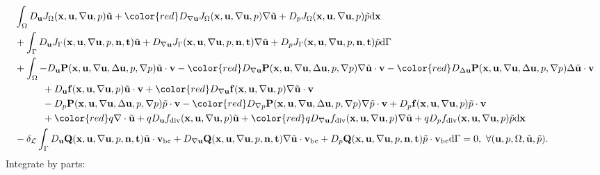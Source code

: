 \documentclass[oneside]{book}
\numberwithin{equation}{section}
\begin{document}
\begin{align*}
    &\int_\Omega D_{\bf u}J_\Omega({\bf x},{\bf u},\nabla{\bf u},p)\tilde{\bf u} + {\color{red}D_{\nabla{\bf u}}J_\Omega({\bf x},{\bf u},\nabla{\bf u},p)\nabla\tilde{\bf u}} + D_pJ_\Omega({\bf x},{\bf u},\nabla{\bf u},p)\tilde{p}{\rm d}{\bf x}\\
    &+ \int_\Gamma D_{\bf u}J_\Gamma({\bf x},{\bf u},\nabla{\bf u},p,{\bf n},{\bf t})\tilde{\bf u} + D_{\nabla{\bf u}}J_\Gamma({\bf x},{\bf u},\nabla{\bf u},p,{\bf n},{\bf t})\nabla\tilde{\bf u} + D_pJ_\Gamma({\bf x},{\bf u},\nabla{\bf u},p,{\bf n},{\bf t})\tilde{p}{\rm d}\Gamma\\
    &+ \int_\Omega -D_{\bf u}{\bf P}({\bf x},{\bf u},\nabla{\bf u},\Delta{\bf u},p,\nabla p)\tilde{\bf u}\cdot{\bf v} - {\color{red}D_{\nabla{\bf u}}{\bf P}({\bf x},{\bf u},\nabla{\bf u},\Delta{\bf u},p,\nabla p)\nabla\tilde{\bf u}\cdot{\bf v}} -  {\color{red}D_{\Delta{\bf u}}{\bf P}({\bf x},{\bf u},\nabla{\bf u},\Delta{\bf u},p,\nabla p)\Delta\tilde{\bf u}\cdot{\bf v}}\\
    &\hspace{1cm} + D_{\bf u}{\bf f}({\bf x},{\bf u},\nabla{\bf u},p)\tilde{\bf u}\cdot{\bf v} +  {\color{red}D_{\nabla{\bf u}}{\bf f}({\bf x},{\bf u},\nabla{\bf u},p)\nabla\tilde{\bf u}\cdot{\bf v}}\\
    &\hspace{1cm} - D_p{\bf P}({\bf x},{\bf u},\nabla{\bf u},\Delta{\bf u},p,\nabla p)\tilde{p}\cdot{\bf v} -  {\color{red}D_{\nabla p}{\bf P}({\bf x},{\bf u},\nabla{\bf u},\Delta{\bf u},p,\nabla p)\nabla\tilde{p}\cdot{\bf v}} + D_p{\bf f}({\bf x},{\bf u},\nabla{\bf u},p)\tilde{p}\cdot{\bf v}\\
    &\hspace{1cm} +  {\color{red}q\nabla\cdot\tilde{\bf u}} + qD_{\bf u}f_{\rm div}({\bf x},{\bf u},\nabla{\bf u},p)\tilde{\bf u} +  {\color{red}qD_{\nabla{\bf u}}f_{\rm div}({\bf x},{\bf u},\nabla{\bf u},p)\nabla\tilde{\bf u}} + qD_pf_{\rm div}({\bf x},{\bf u},\nabla{\bf u},p)\tilde{p}{\rm d}{\bf x}\\
    &- \delta_{\mathcal{L}}\int_\Gamma D_{\bf u}{\bf Q}({\bf x},{\bf u},\nabla{\bf u},p,{\bf n},{\bf t})\tilde{\bf u}\cdot{\bf v}_{\rm bc} + D_{\nabla{\bf u}}{\bf Q}({\bf x},{\bf u},\nabla{\bf u},p,{\bf n},{\bf t})\nabla\tilde{\bf u}\cdot{\bf v}_{\rm bc} + D_p{\bf Q}({\bf x},{\bf u},\nabla{\bf u},p,{\bf n},{\bf t})\tilde{p}\cdot{\bf v}_{\rm bc}{\rm d}\Gamma = 0,\ \forall({\bf u},p,\Omega,\tilde{\bf u},\tilde{p}).
\end{align*}
Integrate by parts:
\end{document}
